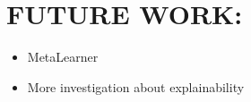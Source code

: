 \documentclass[11pt]{article}
\makeatletter
\providecommand{\tightlist}{%
      \setlength{\itemsep}{0pt}\setlength{\parskip}{0pt}}
\newcommand{\boxspacing}{\kern\kvtcb@left@rule\kern\kvtcb@boxsep}
\newcommand{\prompt}[4]{
        {\ttfamily\llap{{\color{#2}[#3]:\hspace{3pt}#4}}\vspace{-\baselineskip}}
    }
\makeatother
\begin{document}
    \hypertarget{future-work}{%
\section{FUTURE WORK:}\label{future-work}}

\begin{itemize}
\tightlist
\item
  MetaLearner
\item
  More investigation about explainability
\end{itemize}

    \begin{tcolorbox}[breakable, size=fbox, boxrule=1pt, pad at break*=1mm,colback=cellbackground, colframe=cellborder]
\prompt{In}{incolor}{ }{\boxspacing}
\begin{Verbatim}[commandchars=\\\{\}]

\end{Verbatim}
\end{tcolorbox}


    
    
    
\end{document}
